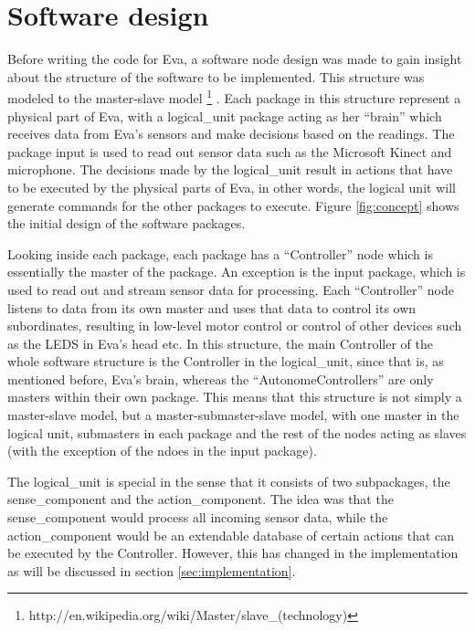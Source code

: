 \documentclass[technical_document.tex]{subfiles}
\begin{document}
\section{Software design}
Before writing the code for Eva, a software node design was made to gain insight about the structure of the software to be 
implemented. This structure was modeled to the master-slave model \footnote{http://en.wikipedia.org/wiki/Master/slave\_(technology)} . Each package in this structure represent a physical 
part of Eva, with a logical\_unit package acting as her ``brain'' which receives data from Eva's sensors and make decisions 
based on the readings. The package input is used to read out sensor data such as the Microsoft Kinect and microphone. The 
decisions made by the logical\_unit result in actions that have to be executed by the physical parts of Eva, in other 
words, the logical unit will generate commands for the other packages to execute. Figure \ref{fig:concept} shows the initial design of the software packages.

Looking inside each package, each package has a ``Controller'' node which is essentially the master of the package. An exception is the input package, which is used to read out and stream sensor data for processing. Each ``Controller'' node listens to data from its own master and uses that data to control its own subordinates, resulting in low-level motor control or control of other devices such as the LEDS in Eva's head etc. In this structure, the main Controller of the whole software structure is the Controller in the logical\_unit, since that is, as mentioned before, Eva's brain, whereas the ``AutonomeControllers'' are only masters within their own package. This means that this structure is not simply a master-slave model, but a master-submaster-slave model, with one master in the logical unit, submasters in each package and the rest of the nodes acting as slaves (with the exception of the ndoes in the input package). 

The logical\_unit is special in the sense that it consists of two subpackages, the sense\_component and the action\_component. The idea was that the sense\_component would process all incoming sensor data, while the action\_component would be an extendable database of certain actions that can be executed by the Controller. However, this has changed in the implementation as will be discussed in section \ref{sec:implementation}. 
\end{document}

